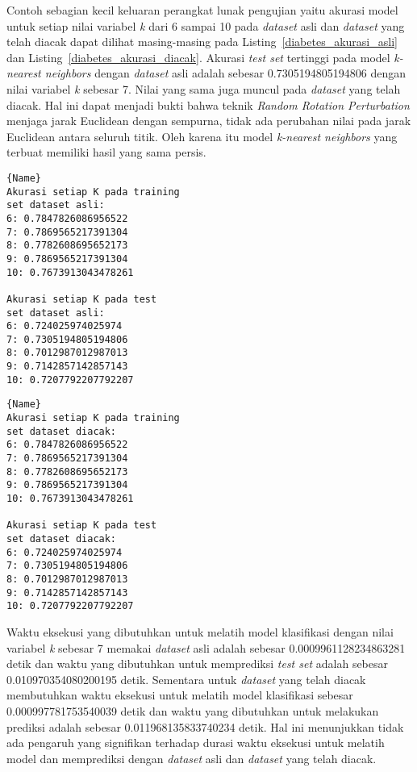 Contoh sebagian kecil keluaran perangkat lunak pengujian yaitu akurasi model untuk setiap nilai variabel \textit{k} dari 6 sampai 10 pada \textit{dataset} asli dan \textit{dataset} yang telah diacak dapat dilihat masing-masing pada Listing~\ref{diabetes_akurasi_asli} dan Listing~\ref{diabetes_akurasi_diacak}. Akurasi \textit{test set} tertinggi pada model \textit{k-nearest neighbors} dengan \textit{dataset} asli adalah sebesar 0.7305194805194806 dengan nilai variabel \textit{k} sebesar 7. Nilai yang sama juga muncul pada \textit{dataset} yang telah diacak. Hal ini dapat menjadi bukti bahwa teknik \textit{Random Rotation Perturbation} menjaga jarak Euclidean dengan sempurna, tidak ada perubahan nilai pada jarak Euclidean antara seluruh titik. Oleh karena itu model \textit{k-nearest neighbors} yang terbuat memiliki hasil yang sama persis.

\noindent\begin{minipage}{.48\textwidth}
	\begin{lstlisting}[caption=\textit{Dataset diabetes} Asli,frame=tlrb, label=diabetes_akurasi_asli]{Name}
Akurasi setiap K pada training 
set dataset asli: 
6: 0.7847826086956522
7: 0.7869565217391304
8: 0.7782608695652173
9: 0.7869565217391304
10: 0.7673913043478261

Akurasi setiap K pada test 
set dataset asli: 
6: 0.724025974025974
7: 0.7305194805194806
8: 0.7012987012987013
9: 0.7142857142857143
10: 0.7207792207792207
	\end{lstlisting}
\end{minipage}\hfill
\begin{minipage}{.48\textwidth}
	\begin{lstlisting}[caption=\textit{Dataset diabetes} Diacak,frame=tlrb, label=diabetes_akurasi_diacak]{Name}
Akurasi setiap K pada training 
set dataset diacak: 
6: 0.7847826086956522
7: 0.7869565217391304
8: 0.7782608695652173
9: 0.7869565217391304
10: 0.7673913043478261

Akurasi setiap K pada test 
set dataset diacak: 
6: 0.724025974025974
7: 0.7305194805194806
8: 0.7012987012987013
9: 0.7142857142857143
10: 0.7207792207792207
	\end{lstlisting}
\end{minipage}
	
Waktu eksekusi yang dibutuhkan untuk melatih model klasifikasi dengan nilai variabel \textit{k} sebesar 7 memakai \textit{dataset} asli adalah sebesar 0.0009961128234863281 detik dan waktu yang dibutuhkan untuk memprediksi \textit{test set} adalah sebesar 0.010970354080200195 detik. Sementara untuk \textit{dataset} yang telah diacak membutuhkan waktu eksekusi untuk melatih model klasifikasi sebesar 0.000997781753540039 detik dan waktu yang dibutuhkan untuk melakukan prediksi adalah sebesar 0.011968135833740234 detik. Hal ini menunjukkan tidak ada pengaruh yang signifikan terhadap durasi waktu eksekusi untuk melatih model dan memprediksi dengan \textit{dataset} asli dan \textit{dataset} yang telah diacak.

